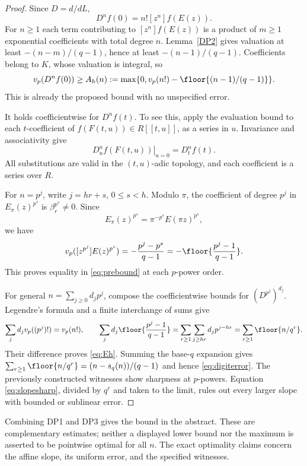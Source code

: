 \documentclass[11pt,a4paper]{article}
\theoremstyle{definition}\newtheorem{remark}[theorem]{Remark}
\newcommand{\vp}{v_p}\newcommand{\dR}{\mathrm{dR}}\newcommand{\crys}{\mathrm{crys}}
\begin{document}
\begin{proof}
Since $D=d/dL$,
\begin{equation}\label{eq:eval}
 D^nf(0)=n![z^n]f(E(z)).
\end{equation}
For $n\ge1$ each term contributing to $[z^n]f(E(z))$ is a product of $m\ge1$ exponential coefficients with total degree $n$. Lemma~\ref{DP2} gives valuation at least $-(n-m)/(q-1)$, hence at least $-(n-1)/(q-1)$. Coefficients belong to $K$, whose valuation is integral, so
\begin{equation}\label{eq:prebound}
 \vp(D^nf(0))\ge A_h(n):=\max\{0,\vp(n!)-\floor{(n-1)/(q-1)}\}.
\end{equation}
This is already the proposed bound with no unspecified error.

It holds coefficientwise for $D^nf(t)$. To see this, apply the evaluation bound to each $t$-coefficient of $f(F(t,u))\in R[[t,u]]$, as a series in $u$. Invariance and associativity give
\[
 \left.D_u^nf(F(t,u))\right|_{u=0}=D_t^nf(t).
\]
All substitutions are valid in the $(t,u)$-adic topology, and each coefficient is a series over $R$.

For $n=p^j$, write $j=hr+s$, $0\le s<h$. Modulo $\pi$, the coefficient of degree $p^j$ in $E_\pi(z)^{p^s}$ is $\beta_r^{p^s}\ne0$. Since
\[
 E_\pi(z)^{p^s}=\pi^{-p^s}E(\pi z)^{p^s},
\]
we have
\[
 \vp([z^{p^j}]E(z)^{p^s})=-\frac{p^j-p^s}{q-1}
 =-\floor{\frac{p^j-1}{q-1}}.
\]
This proves equality in \eqref{eq:prebound} at each $p$-power order.

For general $n=\sum_{j\ge0}d_jp^j$, compose the coefficientwise bounds for $(D^{p^j})^{d_j}$. Legendre's formula and a finite interchange of sums give
\[
 \sum_jd_j\vp((p^j)!)=\vp(n!),\qquad
 \sum_jd_j\floor{\frac{p^j-1}{q-1}}
 =\sum_{r\ge1}\sum_{j\ge hr}d_jp^{j-hr}
 =\sum_{r\ge1}\floor{n/q^r}.
\]
Their difference proves \eqref{eq:Eh}. Summing the base-$q$ expansion gives $\sum_{r\ge1}\floor{n/q^r}=(n-s_q(n))/(q-1)$ and hence \eqref{eq:digiterror}. The previously constructed witnesses show sharpness at $p$-powers. Equation \eqref{eq:slopesharp}, divided by $q^r$ and taken to the limit, rules out every larger slope with bounded or sublinear error.
\end{proof}

Combining DP1 and DP3 gives the bound in the abstract. These are complementary estimates; neither a displayed lower bound nor the maximum is asserted to be pointwise optimal for all $n$. The exact optimality claims concern the affine slope, its uniform error, and the specified witnesses.
\end{document}
